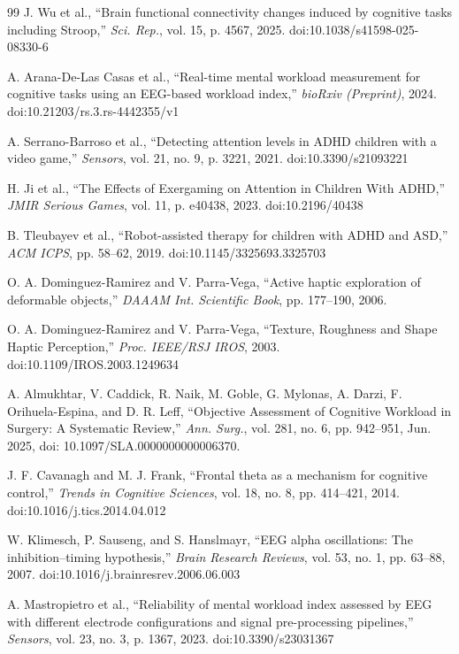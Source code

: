 \documentclass[10pt]{iopart}
\begin{document}
\begin{thebibliography}{99}
J. Wu et al., ``Brain functional connectivity changes induced by cognitive tasks including Stroop,'' \emph{Sci. Rep.}, vol. 15, p. 4567, 2025. doi:10.1038/s41598-025-08330-6

A. Arana-De-Las Casas et al., ``Real-time mental workload measurement for cognitive tasks using an EEG-based workload index,'' \emph{bioRxiv (Preprint)}, 2024. doi:10.21203/rs.3.rs-4442355/v1

A. Serrano-Barroso et al., ``Detecting attention levels in ADHD children with a video game,'' \emph{Sensors}, vol. 21, no. 9, p. 3221, 2021. doi:10.3390/s21093221

H. Ji et al., ``The Effects of Exergaming on Attention in Children With ADHD,'' \emph{JMIR Serious Games}, vol. 11, p. e40438, 2023. doi:10.2196/40438

B. Tleubayev et al., ``Robot-assisted therapy for children with ADHD and ASD,'' \emph{ACM ICPS}, pp. 58–62, 2019. doi:10.1145/3325693.3325703

O. A. Dominguez-Ramirez and V. Parra-Vega, ``Active haptic exploration of deformable objects,'' \emph{DAAAM Int. Scientific Book}, pp. 177–190, 2006.

O. A. Dominguez-Ramirez and V. Parra-Vega, ``Texture, Roughness and Shape Haptic Perception,'' \emph{Proc. IEEE/RSJ IROS}, 2003. doi:10.1109/IROS.2003.1249634

A. Almukhtar, V. Caddick, R. Naik, M. Goble, G. Mylonas, A. Darzi, 
F. Orihuela-Espina, and D. R. Leff, 
``Objective Assessment of Cognitive Workload in Surgery: A Systematic Review,'' 
\emph{Ann. Surg.}, vol. 281, no. 6, pp. 942--951, Jun. 2025, 
doi: 10.1097/SLA.0000000000006370.

J. F. Cavanagh and M. J. Frank,
``Frontal theta as a mechanism for cognitive control,''
\emph{Trends in Cognitive Sciences}, vol. 18, no. 8, pp. 414--421, 2014.
doi:10.1016/j.tics.2014.04.012

W. Klimesch, P. Sauseng, and S. Hanslmayr,
``EEG alpha oscillations: The inhibition--timing hypothesis,''
\emph{Brain Research Reviews}, vol. 53, no. 1, pp. 63--88, 2007.
doi:10.1016/j.brainresrev.2006.06.003

A. Mastropietro et al.,
``Reliability of mental workload index assessed by EEG with different electrode configurations and signal pre-processing pipelines,''
\emph{Sensors}, vol. 23, no. 3, p. 1367, 2023.
doi:10.3390/s23031367


\end{thebibliography}
\end{document}
